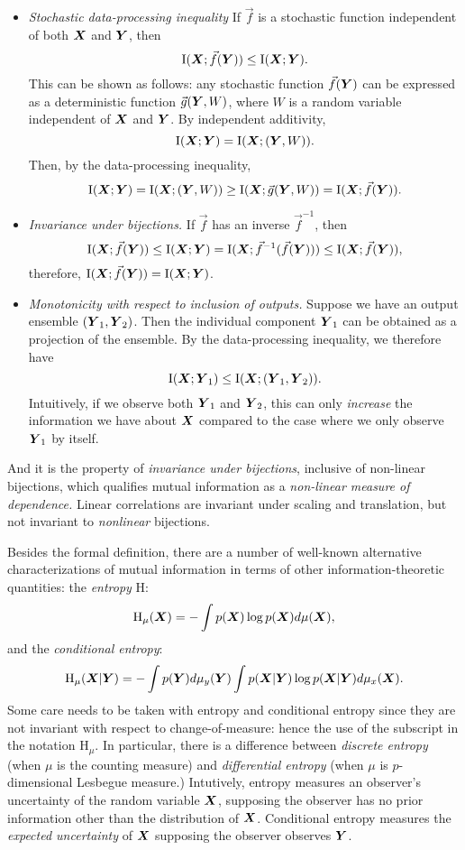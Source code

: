 \begin{itemize}
\item \emph{Stochastic data-processing inequality}  If $\vec{f}$ is a stochastic function independent of both $\boldsymbol{X}$ and $\boldsymbol{Y}$, then
\[
\text{I}(\boldsymbol{X}; \vec{f}(\boldsymbol{Y})) \leq \text{I}(\boldsymbol{X}; \boldsymbol{Y}).
\]
This can be shown as follows: any stochastic function $\vec{f}(\boldsymbol{Y})$
can be expressed as a deterministic function $\vec{g}(\boldsymbol{Y}, W)$, where
$W$ is a random variable independent of $\boldsymbol{X}$ and $\boldsymbol{Y}$.
By independent additivity,
\[
\text{I}(\boldsymbol{X}; \boldsymbol{Y}) = \text{I}(\boldsymbol{X}; (\boldsymbol{Y}, W)).
\]
Then, by the data-processing inequality,
\[
\text{I}(\boldsymbol{X}; \boldsymbol{Y}) = \text{I}(\boldsymbol{X}; (\boldsymbol{Y}, W)) \geq \text{I}(\boldsymbol{X}; \vec{g}(\boldsymbol{Y}, W)) = \text{I}(\boldsymbol{X}; \vec{f}(\boldsymbol{Y})).
\]
\item \emph{Invariance under bijections.} If $\vec{f}$ has an inverse $\vec{f}^{-1}$, then 
\[
\text{I}(\boldsymbol{X}; \vec{f}(\boldsymbol{Y})) \leq \text{I}(\boldsymbol{X}; \boldsymbol{Y}) = \text{I}(\boldsymbol{X}; \vec{f}^{-1}(\vec{f}(\boldsymbol{Y}))) \leq \text{I}(\boldsymbol{X}; \vec{f}(\boldsymbol{Y})),
\]
therefore, $\text{I}(\boldsymbol{X}; \vec{f}(\boldsymbol{Y})) = \text{I}(\boldsymbol{X}; \boldsymbol{Y})$.
\item \emph{Monotonicity with respect to inclusion of outputs.}  Suppose we have an output ensemble $(\boldsymbol{Y}_1,\boldsymbol{Y}_2)$.  Then the individual component $\boldsymbol{Y}_1$ can be obtained as a projection of the ensemble.  By the data-processing inequality, we therefore have
\[
\text{I}(\boldsymbol{X}; \boldsymbol{Y}_1) \leq \text{I}(\boldsymbol{X}; (\boldsymbol{Y}_1, \boldsymbol{Y}_2)).
\]
Intuitively, if we observe both $\boldsymbol{Y}_1$ and $\boldsymbol{Y}_2$, this can
only \emph{increase} the information we have about $\boldsymbol{X}$ compared to
the case where we only observe $\boldsymbol{Y}_1$ by itself.
\end{itemize}
And it is the property of \emph{invariance under bijections},
inclusive of non-linear bijections, which qualifies mutual information
as a \emph{non-linear measure of dependence.}  Linear correlations are
invariant under scaling and translation, but not invariant
to \emph{nonlinear} bijections.

Besides the formal definition, there are a number of well-known alternative
characterizations of mutual information in terms of other
information-theoretic quantities: the \emph{entropy} $\text{H}$:
\[
\text{H}_\mu(\boldsymbol{X}) = -\int p(\boldsymbol{X}) \log p(\boldsymbol{X}) d\mu(\boldsymbol{X}),
\]
and the \emph{conditional entropy}:
\[
\text{H}_\mu(\boldsymbol{X}|\boldsymbol{Y}) = -\int p(\boldsymbol{Y}) d\mu_y(\boldsymbol{Y}) \int p(\boldsymbol{X}|\boldsymbol{Y}) \log p(\boldsymbol{X}|\boldsymbol{Y}) d\mu_x(\boldsymbol{X}).
\]
Some care needs to be taken with entropy and conditional entropy since
they are not invariant with respect to change-of-measure: hence the
use of the subscript in the notation $\text{H}_\mu$.  In particular,
there is a difference between \emph{discrete entropy} (when $\mu$ is
the counting measure) and \emph{differential entropy} (when $\mu$ is
$p$-dimensional Lesbegue measure.)  Intutively, entropy measures an
observer's uncertainty of the random variable $\boldsymbol{X}$, supposing the
observer has no prior information other than the distribution of
$\boldsymbol{X}$. Conditional entropy measures the \emph{expected uncertainty} of
$\boldsymbol{X}$ supposing the observer observes $\boldsymbol{Y}$.

